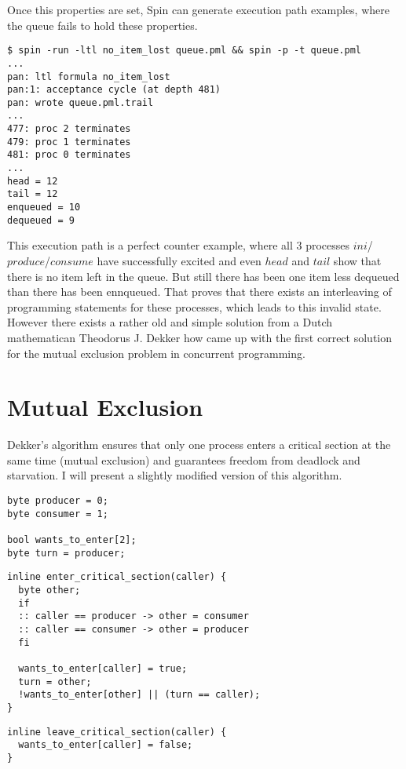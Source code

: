 \documentclass{article}
\begin{document}
Once this properties are set, Spin can generate execution path examples, where the queue fails to hold these properties.

\begin{verbatim}
$ spin -run -ltl no_item_lost queue.pml && spin -p -t queue.pml
...
pan: ltl formula no_item_lost
pan:1: acceptance cycle (at depth 481)
pan: wrote queue.pml.trail
...
477: proc 2 terminates
479: proc 1 terminates
481: proc 0 terminates
...
head = 12
tail = 12
enqueued = 10
dequeued = 9
\end{verbatim}

This execution path is a perfect counter example, where all 3 processes $ini$/$produce$/$consume$ have successfully excited and even $head$ and $tail$ show that there is no item left in the queue.
But still there has been one item less dequeued than there has been ennqueued. 
That proves that there exists an interleaving of programming statements for these processes, which leads to this invalid state. 
However there exists a rather old and simple solution from a Dutch mathematican Theodorus J. Dekker how came up with the first correct solution for the mutual exclusion problem in concurrent programming.

\section{Mutual Exclusion}
Dekker's algorithm ensures that only one process enters a critical section at the same time (mutual exclusion) and guarantees freedom from deadlock and starvation. 
I will present a slightly modified version of this algorithm.

\begin{lstlisting}[language=Promela]
byte producer = 0;
byte consumer = 1;

bool wants_to_enter[2];
byte turn = producer;
\end{lstlisting}

\begin{lstlisting}[language=Promela]
inline enter_critical_section(caller) {
  byte other;
  if
  :: caller == producer -> other = consumer
  :: caller == consumer -> other = producer
  fi

  wants_to_enter[caller] = true;
  turn = other;
  !wants_to_enter[other] || (turn == caller);
}
\end{lstlisting}

\begin{lstlisting}[language=Promela]
inline leave_critical_section(caller) {
  wants_to_enter[caller] = false;
}
\end{lstlisting}
\end{document}
